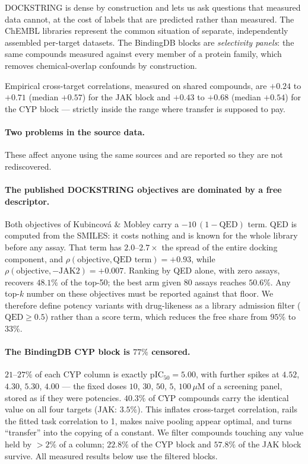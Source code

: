 \documentclass[11pt]{article}
\begin{document}
DOCKSTRING is dense by construction and lets us ask questions that measured data
cannot, at the cost of labels that are predicted rather than measured. The
ChEMBL libraries represent the common situation of separate, independently
assembled per-target datasets. The BindingDB blocks are \emph{selectivity
panels}: the same compounds measured against every member of a protein family,
which removes chemical-overlap confounds by construction.

Empirical cross-target correlations, measured on shared compounds, are
$+0.24$ to $+0.71$ (median $+0.57$) for the JAK block and $+0.43$ to $+0.68$
(median $+0.54$) for the CYP block --- strictly inside the range where transfer
is supposed to pay.

\paragraph{Two problems in the source data.}
\label{sec:data-quality}

These affect anyone using the same sources and are reported so they are not
rediscovered.

\paragraph{The published DOCKSTRING objectives are dominated by a free
descriptor.} Both objectives of Kubincov\'a \& Mobley carry a
$-10\,(1 - \mathrm{QED})$ term. QED is computed from the SMILES: it costs
nothing and is known for the whole library before any assay. That term has
$2.0$--$2.7\times$ the spread of the entire docking component, and
$\rho(\text{objective}, \text{QED term}) = +0.93$, while
$\rho(\text{objective}, -\text{JAK2}) = +0.007$. Ranking by QED alone, with zero
assays, recovers $48.1\%$ of the top-50; the best arm given 80 assays reaches
$50.6\%$. Any top-$k$ number on these objectives must be reported against that
floor. We therefore define potency variants with drug-likeness as a library
admission filter ($\mathrm{QED} \ge 0.5$) rather than a score term, which
reduces the free share from $95\%$ to $33\%$.

\paragraph{The BindingDB CYP block is $77\%$ censored.} $21$--$27\%$ of each CYP
column is exactly pIC$_{50} = 5.00$, with further spikes at $4.52$, $4.30$,
$5.30$, $4.00$ --- the fixed doses $10$, $30$, $50$, $5$, $100\,\mu$M of a
screening panel, stored as if they were potencies. $40.3\%$ of CYP compounds
carry the identical value on all four targets (JAK: $3.5\%$). This inflates
cross-target correlation, rails the fitted task correlation to 1, makes naive
pooling appear optimal, and turns ``transfer'' into the copying of a constant.
We filter compounds touching any value held by $>2\%$ of a column; $22.8\%$ of
the CYP block and $57.8\%$ of the JAK block survive. All measured results below
use the filtered blocks.
\end{document}
